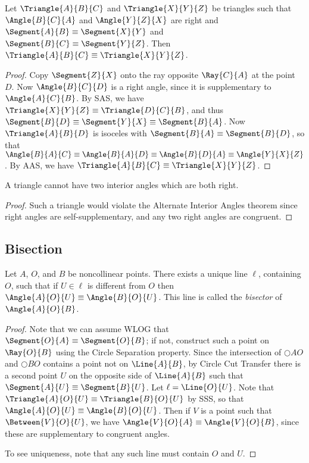 \documentclass{article}
\begin{document}
\begin{prop}[HL]
Let $\Triangle{A}{B}{C}$ and $\Triangle{X}{Y}{Z}$ be triangles such that $\Angle{B}{C}{A}$ and $\Angle{Y}{Z}{X}$ are right and $\Segment{A}{B} \equiv \Segment{X}{Y}$ and $\Segment{B}{C} \equiv \Segment{Y}{Z}$. Then $\Triangle{A}{B}{C} \equiv \Triangle{X}{Y}{Z}$.
\end{prop}

\begin{proof}
Copy $\Segment{Z}{X}$ onto the ray opposite $\Ray{C}{A}$ at the point $D$. Now $\Angle{B}{C}{D}$ is a right angle, since it is supplementary to $\Angle{A}{C}{B}$. By SAS, we have $\Triangle{X}{Y}{Z} \equiv \Triangle{D}{C}{B}$, and thus $\Segment{B}{D} \equiv \Segment{Y}{X} \equiv \Segment{B}{A}$. Now $\Triangle{A}{B}{D}$ is isoceles with $\Segment{B}{A} \equiv \Segment{B}{D}$, so that $\Angle{B}{A}{C} \equiv \Angle{B}{A}{D} \equiv \Angle{B}{D}{A} \equiv \Angle{Y}{X}{Z}$. By AAS, we have $\Triangle{A}{B}{C} \equiv \Triangle{X}{Y}{Z}$.
\end{proof}

\begin{prop}
A triangle cannot have two interior angles which are both right.
\end{prop}

\begin{proof}
Such a triangle would violate the Alternate Interior Angles theorem since right angles are self-supplementary, and any two right angles are congruent.
\end{proof}

\subsection*{Bisection}

\begin{construct}
Let $A$, $O$, and $B$ be noncollinear points. There exists a unique line $\ell$, containing $O$, such that if $U \in \ell$ is different from $O$ then $\Angle{A}{O}{U} \equiv \Angle{B}{O}{U}$. This line is called the \emph{bisector} of $\Angle{A}{O}{B}$.
\end{construct}

\begin{proof}
Note that we can assume WLOG that $\Segment{O}{A} \equiv \Segment{O}{B}$; if not, construct such a point on $\Ray{O}{B}$ using the Circle Separation property. Since the intersection of $\Circle{A}{O}$ and $\Circle{B}{O}$ contains a point not on $\Line{A}{B}$, by Circle Cut Transfer there is a second point $U$ on the opposite side of $\Line{A}{B}$ such that $\Segment{A}{U} \equiv \Segment{B}{U}$. Let $\ell = \Line{O}{U}$. Note that $\Triangle{A}{O}{U} \equiv \Triangle{B}{O}{U}$ by SSS, so that $\Angle{A}{O}{U} \equiv \Angle{B}{O}{U}$. Then if $V$ is a point such that $\Between{V}{O}{U}$, we have $\Angle{V}{O}{A} \equiv \Angle{V}{O}{B}$, since these are supplementary to congruent angles.

To see uniqueness, note that any such line must contain $O$ and $U$.
\end{proof}
\end{document}
